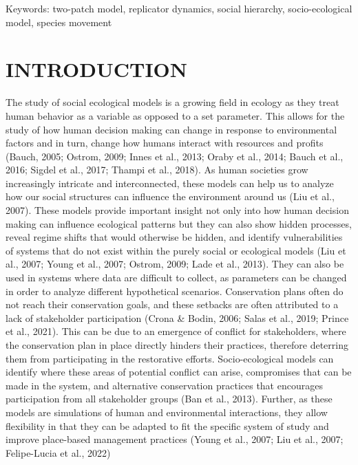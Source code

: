 \documentclass[
  12pt,
]{article}
\begin{document}
Keywords: two-patch model, replicator dynamics, social hierarchy, socio-ecological model, species movement

\hypertarget{introduction}{%
\section{INTRODUCTION}\label{introduction}}

The study of social ecological models is a growing field in ecology as they treat human behavior as a variable as opposed to a set parameter. This allows for the study of how human decision making can change in response to environmental factors and in turn, change how humans interact with resources and profits (Bauch, 2005; Ostrom, 2009; Innes et al., 2013; Oraby et al., 2014; Bauch et al., 2016; Sigdel et al., 2017; Thampi et al., 2018). As human societies grow increasingly intricate and interconnected, these models can help us to analyze how our social structures can influence the environment around us (Liu et al., 2007). These models provide important insight not only into how human decision making can influence ecological patterns but they can also show hidden processes, reveal regime shifts that would otherwise be hidden, and identify vulnerabilities of systems that do not exist within the purely social or ecological models (Liu et al., 2007; Young et al., 2007; Ostrom, 2009; Lade et al., 2013). They can also be used in systems where data are difficult to collect, as parameters can be changed in order to analyze different hypothetical scenarios. Conservation plans often do not reach their conservation goals, and these setbacks are often attributed to a lack of stakeholder participation (Crona \& Bodin, 2006; Salas et al., 2019; Prince et al., 2021). This can be due to an emergence of conflict for stakeholders, where the conservation plan in place directly hinders their practices, therefore deterring them from participating in the restorative efforts. Socio-ecological models can identify where these areas of potential conflict can arise, compromises that can be made in the system, and alternative conservation practices that encourages participation from all stakeholder groups (Ban et al., 2013). Further, as these models are simulations of human and environmental interactions, they allow flexibility in that they can be adapted to fit the specific system of study and improve place-based management practices (Young et al., 2007; Liu et al., 2007; Felipe-Lucia et al., 2022)
\end{document}
